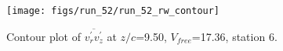 \begin{figure}[H]
\centering
\texttt{[image: figs/run\_52/run\_52\_rw\_contour]}
\caption{Contour plot of $\overline{v_{r}^{\prime} v_{z}^{\prime}}$ at $z/c$=9.50, $V_{free}$=17.36, station 6.}
\label{fig:run_52_rw_contour}
\end{figure}


